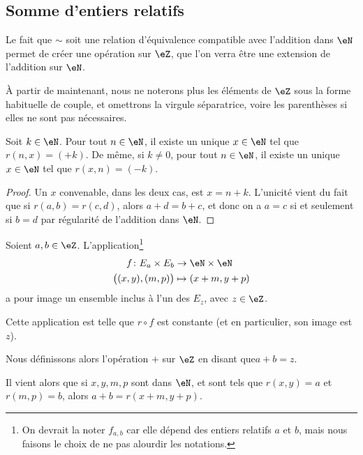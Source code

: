 \subsection{Somme d'entiers relatifs}
\label{SUBooEntiersRelatifsOpposes}

\begin{normaltext}	\label{NORooIntroSommeRelatifs}
	Le fait que \( \sim \) soit une relation d'équivalence compatible avec l'addition dans \( \eN \) permet de créer une opération sur \( \eZ \), que l'on verra être une extension de l'addition sur \( \eN \).

 	À partir de maintenant, nous ne noterons plus les éléments de \( \eZ \) sous la forme habituelle de couple, et omettrons la virgule séparatrice, voire les parenthèses si elles ne sont pas nécessaires.
\end{normaltext}

\begin{lemma}	\label{LEMooResolutionEquationDifference}
	Soit \( k \in \eN \). Pour tout \( n \in \eN \), il existe un unique \( x \in \eN \) tel que \( r(n,x) = (+k) \). De même, si \( k \neq 0 \), pour tout \( n \in \eN \), il existe un unique \( x \in \eN \) tel que \( r(x,n) = (-k) \). 
\end{lemma}

\begin{proof}
	Un \( x \) convenable, dans les deux cas, est \( x = n+k \). L'unicité vient du fait que si \( r(a,b) = r(c,d) \), alors \( a+d = b+c \), et donc on a \( a = c \) si et seulement si \( b = d \) par régularité de l'addition dans \( \eN \).
\end{proof}

\begin{propositionDef}	\label{PROPooDEFAdditionEntiersRelatifs}
	Soient \( a, b \in \eZ\). L'application\footnote{On devrait la noter \( f_{a,b} \) car elle dépend des entiers relatifs \( a \) et \( b \), mais nous faisons le choix de ne pas alourdir les notations.}
	\begin{equation}
		\begin{aligned}
			f \colon E_a \times E_b & \to \eN \times \eN              \\
			\big( (x,y),(m,p) \big)                         & \mapsto (x+m,y+p)
		\end{aligned}
	\end{equation}
	a pour image un ensemble inclus à l'un des \( E_z \), avec \( z \in \eZ \).

 	Cette application est telle que \( r \circ f \) est constante (et en particulier, son image est \( z \)).

	Nous définissons alors l'opération \( + \) sur \( \eZ \) en disant que\( a + b = z \).

 	Il vient alors que si \( x, y, m, p \) sont dans \( \eN \), et sont tels que \( r(x,y) = a \) et \( r(m,p) = b \), alors \( a+b = r(x+m, y+p) \).
\end{propositionDef}

